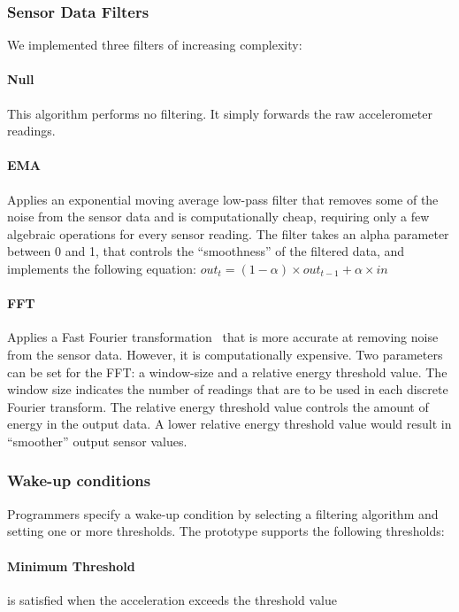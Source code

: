 \subsubsection{Sensor Data Filters}
\label{sec:sensorDataFilters}

We implemented three filters of increasing complexity:

\paragraph{Null} This algorithm performs no filtering.  It simply
  forwards the raw accelerometer readings.


  \paragraph{EMA} Applies an exponential moving average low-pass
  filter that removes some of the noise from the sensor data and is
  computationally cheap, requiring only a few algebraic operations for
  every sensor reading. The filter takes an alpha parameter between 0
  and 1, that controls the ``smoothness'' of the filtered data, and
  implements the following equation: $out_{t} = (1-\alpha) \times
  out_{t-1} + \alpha \times in$

  \paragraph{FFT} Applies a Fast Fourier
  transformation~\cite{libbyFootstepDetection} that is more accurate
  at removing noise from the sensor data. However, it is
  computationally expensive. Two parameters can be set for the
  FFT: a window-size and a relative energy threshold value. The
  window size indicates the number of readings that are to be used in
  each discrete Fourier transform. The relative energy threshold value
  controls the amount of energy in the output data. A lower relative
  energy threshold value would result in ``smoother'' output sensor
  values.

\subsubsection{Wake-up conditions}

Programmers specify a wake-up condition by selecting a filtering
algorithm and setting one or more thresholds.  The prototype supports
the following thresholds:

\paragraph{Minimum Threshold} is satisfied when the acceleration exceeds the threshold value

